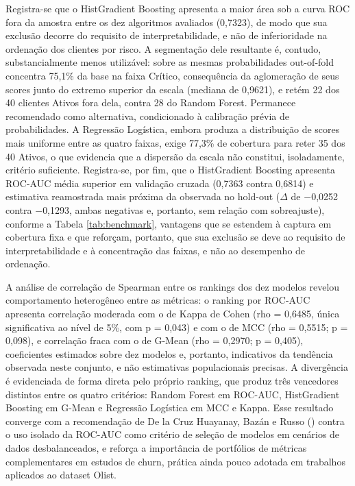 Registra-se que o HistGradient Boosting apresenta a maior área sob a curva ROC fora da amostra entre os dez algoritmos avaliados (0,7323), de modo que sua exclusão decorre do requisito de interpretabilidade, e não de inferioridade na ordenação dos clientes por risco. A segmentação dele resultante é, contudo, substancialmente menos utilizável: sobre as mesmas probabilidades out-of-fold concentra 75,1\% da base na faixa Crítico, consequência da aglomeração de seus scores junto do extremo superior da escala (mediana de 0,9621), e retém 22 dos 40 clientes Ativos fora dela, contra 28 do Random Forest. Permanece recomendado como alternativa, condicionado à calibração prévia de probabilidades. A Regressão Logística, embora produza a distribuição de scores mais uniforme entre as quatro faixas, exige 77,3\% de cobertura para reter 35 dos 40 Ativos, o que evidencia que a dispersão da escala não constitui, isoladamente, critério suficiente. Registra-se, por fim, que o HistGradient Boosting apresenta ROC-AUC média superior em validação cruzada (0,7363 contra 0,6814) e estimativa reamostrada mais próxima da observada no hold-out ($\Delta$ de $-$0,0252 contra $-$0,1293, ambas negativas e, portanto, sem relação com sobreajuste), conforme a Tabela \ref{tab:benchmark}, vantagens que se estendem à captura em cobertura fixa e que reforçam, portanto, que sua exclusão se deve ao requisito de interpretabilidade e à concentração das faixas, e não ao desempenho de ordenação.

A análise de correlação de Spearman entre os rankings dos dez modelos revelou comportamento heterogêneo entre as métricas: o ranking por ROC-AUC apresenta correlação moderada com o de Kappa de Cohen (rho = 0,6485, única significativa ao nível de 5\%, com p = 0,043) e com o de MCC (rho = 0,5515; p = 0,098), e correlação fraca com o de G-Mean (rho = 0,2970; p = 0,405), coeficientes estimados sobre dez modelos e, portanto, indicativos da tendência observada neste conjunto, e não estimativas populacionais precisas. A divergência é evidenciada de forma direta pelo próprio ranking, que produz três vencedores distintos entre os quatro critérios: Random Forest em ROC-AUC, HistGradient Boosting em G-Mean e Regressão Logística em MCC e Kappa. Esse resultado converge com a recomendação de De la Cruz Huayanay, Bazán e Russo (\citeyear{delacruz2025}) contra o uso isolado da ROC-AUC como critério de seleção de modelos em cenários de dados desbalanceados, e reforça a importância de portfólios de métricas complementares em estudos de churn, prática ainda pouco adotada em trabalhos aplicados ao dataset Olist.

